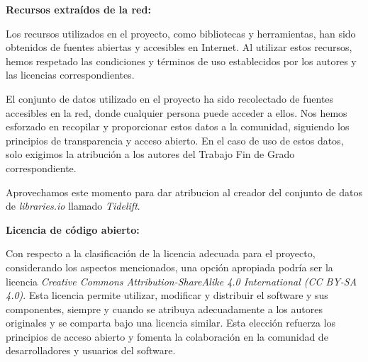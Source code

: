 \textbf{Recursos extraídos de la red:}

Los recursos utilizados en el proyecto, como bibliotecas y herramientas, han sido obtenidos 
de fuentes abiertas y accesibles en Internet. Al utilizar estos recursos, hemos respetado las condiciones y términos de 
uso establecidos por los autores y las licencias correspondientes.

El conjunto de datos utilizado en el proyecto ha sido recolectado de fuentes 
accesibles en la red, donde cualquier persona puede acceder a ellos. Nos hemos esforzado en recopilar y proporcionar estos 
datos a la comunidad, siguiendo los principios de transparencia y acceso abierto. En el caso de uso de estos datos, solo 
exigimos la atribución a los autores del Trabajo Fin de Grado correspondiente.

Aprovechamos este momento para dar atribucion al creador del conjunto de datos de \textit{libraries.io} llamado \textit{Tidelift}.

\textbf{Licencia de código abierto:}

Con respecto a la clasificación de la licencia adecuada para el proyecto, considerando los aspectos mencionados, una opción 
apropiada podría ser la licencia \textit{Creative Commons Attribution-ShareAlike 4.0 International (CC BY-SA 4.0)}. Esta licencia 
permite utilizar, modificar y distribuir el software y sus componentes, siempre y cuando se atribuya adecuadamente a los 
autores originales y se comparta bajo una licencia similar. Esta elección refuerza los principios de acceso abierto y 
fomenta la colaboración en la comunidad de desarrolladores y usuarios del software.


